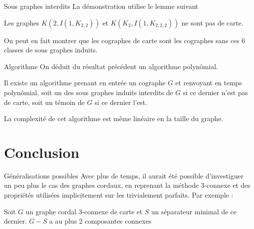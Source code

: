 \documentclass{beamer}
\begin{document}
\begin{frame}{Sous graphes interdits}
    La démonstration utilise le lemme suivant

    \begin{lem}
        Les graphes $K(2, I(1, K_{2,2}))$ et $K(K_2, I(1, K_{2,2,2}))$ ne sont pas de carte.
    \end{lem}

    On peut en fait montrer que les cographes de carte sont les cographes sans ces $6$ classes de sous graphes
    induits.
\end{frame}

\begin{frame}{Algorithme}
    On déduit du résultat précédent un algorithme polynômial.
    \begin{thm}
        Il existe un algorithme prenant en entrée un cographe $G$ et renvoyant en temps polynômial, soit un des sous graphes induits
        interdits de $G$ si ce dernier n'est pas de carte, soit un témoin de $G$ si ce dernier l'est.
    \end{thm}

    La complexité de cet algorithme est même linéaire en la taille du graphe.
\end{frame}

\section*{Conclusion}

\begin{frame}{Généralisations possibles}
    Avec plus de temps, il aurait été possible d'investiguer un peu plus le cas des graphes cordaux, en reprenant
    la méthode $3$-connexe et des propriétés utilisées implicitement sur les trivialement parfaits. Par exemple :

    \begin{proposition}
        Soit $G$ un graphe cordal $3$-connexe de carte et $S$ un séparateur minimal de ce dernier. $G - S$ a au plus $2$ composantes
        connexes
    \end{proposition}
\end{frame}
\end{document}
